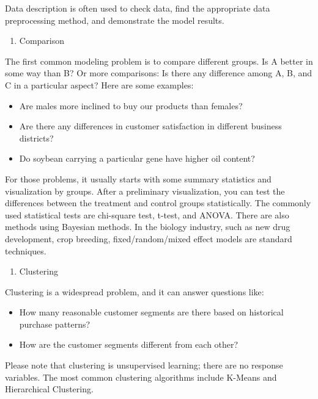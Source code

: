 \documentclass[
  12pt,
]{krantz}
\providecommand{\tightlist}{%
  \setlength{\itemsep}{0pt}\setlength{\parskip}{0pt}}
\begin{document}
Data description is often used to check data, find the appropriate data preprocessing method, and demonstrate the model results.

\begin{enumerate}
\def\labelenumi{\arabic{enumi}.}
\setcounter{enumi}{1}
\tightlist
\item
  Comparison
\end{enumerate}

The first common modeling problem is to compare different groups. Is A better in some way than B? Or more comparisons: Is there any difference among A, B, and C in a particular aspect? Here are some examples:

\begin{itemize}
\tightlist
\item
  Are males more inclined to buy our products than females?
\item
  Are there any differences in customer satisfaction in different business districts?
\item
  Do soybean carrying a particular gene have higher oil content?
\end{itemize}

For those problems, it usually starts with some summary statistics and visualization by groups. After a preliminary visualization, you can test the differences between the treatment and control groups statistically. The commonly used statistical tests are chi-square test, t-test, and ANOVA. There are also methods using Bayesian methods. In the biology industry, such as new drug development, crop breeding, fixed/random/mixed effect models are standard techniques.

\begin{enumerate}
\def\labelenumi{\arabic{enumi}.}
\setcounter{enumi}{2}
\tightlist
\item
  Clustering
\end{enumerate}

Clustering is a widespread problem, and it can answer questions like:

\begin{itemize}
\tightlist
\item
  How many reasonable customer segments are there based on historical purchase patterns?
\item
  How are the customer segments different from each other?
\end{itemize}

Please note that clustering is unsupervised learning; there are no response variables. The most common clustering algorithms include K-Means and Hierarchical Clustering.
\end{document}
